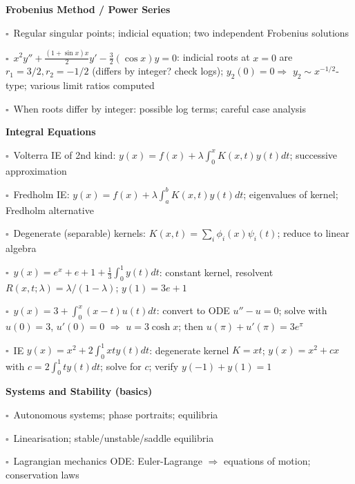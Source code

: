 \documentclass[11pt,a4paper]{article}
\newcommand{\chk}{\textcolor{rulegray}{$\square$}\ }
\begin{document}
\begin{subtopics}
  \item \textbf{Frobenius Method / Power Series}
  \begin{subtopics}
    \item \chk Regular singular points; indicial equation; two independent Frobenius solutions
    \item \chk $x^2y''+\frac{(1+\sin x)x}{2}y'-\frac{3}{2}(\cos x)y=0$: indicial roots at $x=0$ are $r_1=3/2, r_2=-1/2$ (differs by integer? check logs); $y_2(0)=0 \Rightarrow$ $y_2\sim x^{-1/2}$-type; various limit ratios computed
    \item \chk When roots differ by integer: possible log terms; careful case analysis
  \end{subtopics}

  \item \textbf{Integral Equations}
  \begin{subtopics}
    \item \chk Volterra IE of 2nd kind: $y(x)=f(x)+\lambda\int_0^x K(x,t)y(t)dt$; successive approximation
    \item \chk Fredholm IE: $y(x)=f(x)+\lambda\int_a^b K(x,t)y(t)dt$; eigenvalues of kernel; Fredholm alternative
    \item \chk Degenerate (separable) kernels: $K(x,t)=\sum_i \phi_i(x)\psi_i(t)$; reduce to linear algebra
    \item \chk $y(x)=e^x+e+1+\tfrac{1}{3}\int_0^1 y(t)dt$: constant kernel, resolvent $R(x,t;\lambda)=\lambda/(1-\lambda)$; $y(1)=3e+1$
    \item \chk $y(x)=3+\int_0^x(x-t)u(t)dt$: convert to ODE $u''-u=0$; solve with $u(0)=3$, $u'(0)=0$ $\Rightarrow$ $u=3\cosh x$; then $u(\pi)+u'(\pi)=3e^\pi$
    \item \chk IE $y(x)=x^2+2\int_0^1 xty(t)dt$: degenerate kernel $K=xt$; $y(x)=x^2+cx$ with $c=2\int_0^1 ty(t)dt$; solve for $c$; verify $y(-1)+y(1)=1$
  \end{subtopics}

  \item \textbf{Systems and Stability (basics)}
  \begin{subtopics}
    \item \chk Autonomous systems; phase portraits; equilibria
    \item \chk Linearisation; stable/unstable/saddle equilibria
    \item \chk Lagrangian mechanics ODE: Euler-Lagrange $\Rightarrow$ equations of motion; conservation laws
  \end{subtopics}

\end{subtopics}
\end{document}
